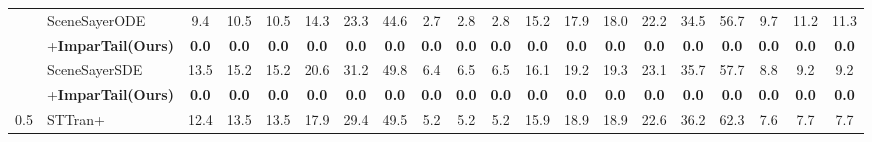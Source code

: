 \begin{table*}[!h]
{\begin{tabular}{l|l|ccccccccc|ccccccccc}
          \cmidrule(lr){3-11} \cmidrule(lr){12-20} 
        &        SceneSayerODE~\cite{peddi_et_al_scene_sayer_2024} & 9.4 & 10.5 & 10.5 & 14.3 & 23.3 & 44.6 & 2.7 & 2.8 & 2.8 & 15.2 & 17.9 & 18.0 & 22.2 & 34.5 & 56.7 & 9.7 & 11.2 & 11.3  \\ 
        &        \quad+\textbf{ImparTail(Ours)} & \cellcolor{highlightColor} \textbf{0.0} & \cellcolor{highlightColor} \textbf{0.0} & \cellcolor{highlightColor} \textbf{0.0} & \cellcolor{highlightColor} \textbf{0.0} & \cellcolor{highlightColor} \textbf{0.0} & \cellcolor{highlightColor} \textbf{0.0} & \cellcolor{highlightColor} \textbf{0.0} & \cellcolor{highlightColor} \textbf{0.0} & \cellcolor{highlightColor} \textbf{0.0} & \cellcolor{highlightColor} \textbf{0.0} & \cellcolor{highlightColor} \textbf{0.0} & \cellcolor{highlightColor} \textbf{0.0} & \cellcolor{highlightColor} \textbf{0.0} & \cellcolor{highlightColor} \textbf{0.0} & \cellcolor{highlightColor} \textbf{0.0} & \cellcolor{highlightColor} \textbf{0.0} & \cellcolor{highlightColor} \textbf{0.0} & \cellcolor{highlightColor} \textbf{0.0}  \\ 
          \cmidrule(lr){3-11} \cmidrule(lr){12-20} 
        &        SceneSayerSDE~\cite{peddi_et_al_scene_sayer_2024} & 13.5 & 15.2 & 15.2 & 20.6 & 31.2 & 49.8 & 6.4 & 6.5 & 6.5 & 16.1 & 19.2 & 19.3 & 23.1 & 35.7 & 57.7 & 8.8 & 9.2 & 9.2  \\ 
        &        \quad+\textbf{ImparTail(Ours)} & \cellcolor{highlightColor} \textbf{0.0} & \cellcolor{highlightColor} \textbf{0.0} & \cellcolor{highlightColor} \textbf{0.0} & \cellcolor{highlightColor} \textbf{0.0} & \cellcolor{highlightColor} \textbf{0.0} & \cellcolor{highlightColor} \textbf{0.0} & \cellcolor{highlightColor} \textbf{0.0} & \cellcolor{highlightColor} \textbf{0.0} & \cellcolor{highlightColor} \textbf{0.0} & \cellcolor{highlightColor} \textbf{0.0} & \cellcolor{highlightColor} \textbf{0.0} & \cellcolor{highlightColor} \textbf{0.0} & \cellcolor{highlightColor} \textbf{0.0} & \cellcolor{highlightColor} \textbf{0.0} & \cellcolor{highlightColor} \textbf{0.0} & \cellcolor{highlightColor} \textbf{0.0} & \cellcolor{highlightColor} \textbf{0.0} & \cellcolor{highlightColor} \textbf{0.0}  \\ 
          \cmidrule(lr){3-11} \cmidrule(lr){12-20} 
        \multirow{12}{*}{0.5} &        STTran+~\cite{peddi_et_al_scene_sayer_2024} & 12.4 & 13.5 & 13.5 & 17.9 & 29.4 & 49.5 & 5.2 & 5.2 & 5.2 & 15.9 & 18.9 & 18.9 & 22.6 & 36.2 & 62.3 & 7.6 & 7.7 & 7.7  \\ 

\end{tabular}}
\end{table*}
